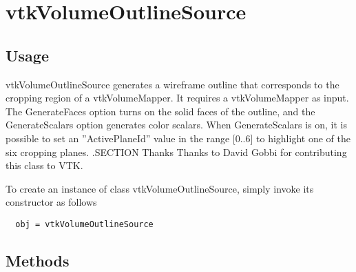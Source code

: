 \section{vtkVolumeOutlineSource}

\subsection{Usage}

 vtkVolumeOutlineSource generates a wireframe outline that corresponds
 to the cropping region of a vtkVolumeMapper.  It requires a 
 vtkVolumeMapper as input.  The GenerateFaces option turns on the
 solid faces of the outline, and the GenerateScalars option generates
 color scalars.  When GenerateScalars is on, it is possible to set
 an ''ActivePlaneId'' value in the range [0..6] to highlight one of the
 six cropping planes.
 .SECTION Thanks
 Thanks to David Gobbi for contributing this class to VTK.

To create an instance of class vtkVolumeOutlineSource, simply
invoke its constructor as follows
\begin{verbatim}
  obj = vtkVolumeOutlineSource
\end{verbatim}
\subsection{Methods}

